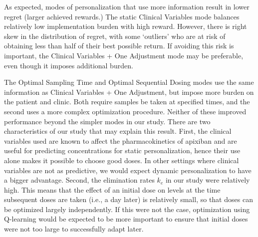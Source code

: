 

As expected, modes of personalization that use more information result in lower regret (larger achieved rewards.)  The static Clinical Variables mode balances relatively low implementation burden with high reward. However, there is right skew in the distribution of regret, with some `outliers' who are at risk of obtaining less than half of their best possible return. If avoiding this risk is important, the Clinical Variables + One Adjustment mode may be preferable, even though it imposes additional burden.

The Optimal Sampling Time and Optimal Sequential Dosing modes use the same information as Clinical Variables + One Adjustment, but impose more burden on the patient and clinic. Both require samples be taken at specified times, and the second uses a more complex optimization procedure. Neither of these improved performance beyond the simpler modes in our study. There are two characteristics of our study that may explain this result. First, the clinical variables used are known to affect the pharmacokinetics of apixiban and are useful for predicting concentrations for static personalization, hence their use alone makes it possible to choose good doses. In other settings where clinical variables are not as predictive, we would expect dynamic personalization to have a bigger advantage. Second, the elimination rates $k_e$ in our study were relatively high. This means that the effect of an initial dose on levels at the time subsequent doses are taken (i.e., a day later) is relatively small, so that doses can be optimized largely independently. If this were not the case, optimization using Q-learning would be expected to be more important to ensure that initial doses were not too large to successfully adapt later.




